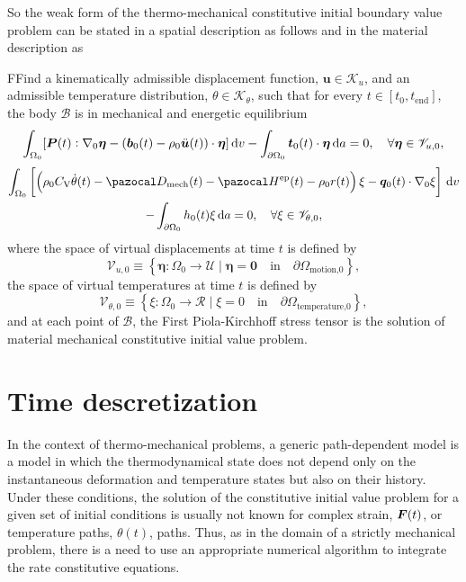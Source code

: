 So the weak form of the thermo-mechanical constitutive initial boundary value problem can be stated in a spatial description as follows
and in the material description as
\begin{problem}
    FFind a kinematically admissible displacement function, $\bm u\in \mathscr{K}_u$, and an admissible temperature distribution, \(\theta \in \mathscr K_\theta\), such that for every $t\in [t_0,t_\text{end}]$, the body $\mathscr{B}$ is in mechanical and energetic equilibrium
        \begin{equation}
        \int_{\Omega_0} [\bm{P}(t):\nabla_0 \bm \eta - (\bm b_0(t)-\rho_0\ddot{\bm u}(t))\cdot \bm \eta]\,\mathrm{d} v - \int_{\partial\Omega_0} \bm t_0(t)\cdot \bm \eta\,\mathrm{d} a = 0,\quad \forall \bm \eta \in \mathscr{V}_{u,0},
        \end{equation}
        \begin{multline}
        \int_{\Omega_0}   \left[\left(\rho_0C_\mathrm{V}\dot\theta(t) -\pazocal D_\text{mech}(t) - \pazocal H^\text{ep}(t) - \rho_0 r(t)\right) \xi - \bm q_0(t)\cdot \nabla_0 \xi\right]\ud v\\ - \int_{\partial\Omega_0} h_0(t) \xi\ud a = 0,\quad \forall \xi \in \mathscr{V}_{\theta,0},
    \end{multline}
    where the space of virtual displacements at time $t$ is defined by
    \begin{equation}
        \mathscr{V}_{u,0} \equiv \left\{\bm \eta:\Omega_0\to \mathscr{U}\;|\;\bm \eta = \bm 0\quad \text{in}\quad \partial\Omega_\text{motion,0}\right\},
    \end{equation}
    the space of virtual temperatures at time $t$ is defined by
    \begin{equation}
    \mathscr{V}_{\theta,0} \equiv \left\{\xi:\Omega_0\to \mathscr{R}\;|\; \xi =  0\quad \text{in}\quad \partial\Omega_\text{temperature,0}\right\},
    \end{equation}
    and at each point of $\mathscr{B}$, the First Piola-Kirchhoff stress tensor is the solution of material mechanical constitutive initial value problem.
\end{problem}

\section{Time descretization} \label{sec:time_discretization}

In the context of thermo-mechanical problems, a generic path-dependent model is a model in which the thermodynamical state does not depend only on the instantaneous deformation and temperature states but also on their history.
Under these conditions, the solution of the constitutive initial value problem for a given set of initial conditions is usually not known for complex strain, $\bm{F}(t)$, or temperature paths, \(\theta(t)\), paths.
Thus, as in the domain of a strictly mechanical problem, there is a need to use an appropriate numerical algorithm to integrate the rate constitutive equations.

